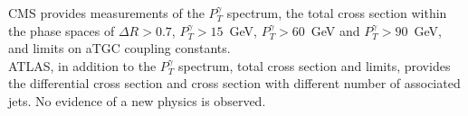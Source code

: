 CMS provides measurements of the $P_T^\gamma$ spectrum, the total cross section within the phase spaces of $\Delta R>0.7$, $P_T^\gamma>15$~GeV, $P_T^\gamma>60$~GeV and $P_T^\gamma>90$~GeV, and limits on aTGC coupling constants.\\

ATLAS, in addition to the $P_T^\gamma$ spectrum, total cross section and limits, provides the differential cross section and cross section with different number of associated jets. No evidence of a new physics is observed.\\





